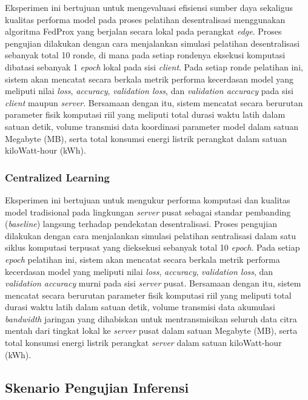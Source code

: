 Eksperimen ini bertujuan untuk mengevaluasi efisiensi sumber daya sekaligus kualitas performa model pada proses pelatihan desentralisasi menggunakan algoritma FedProx yang berjalan secara lokal pada perangkat \textit{edge}. Proses pengujian dilakukan dengan cara menjalankan simulasi pelatihan desentralisasi sebanyak total 10 ronde, di mana pada setiap rondenya eksekusi komputasi dibatasi sebanyak 1 \textit{epoch} lokal pada sisi \textit{client}. Pada setiap ronde pelatihan ini, sistem akan mencatat secara berkala metrik performa kecerdasan model yang meliputi nilai \textit{loss}, \textit{accuracy}, \textit{validation loss}, dan \textit{validation accuracy} pada sisi \textit{client} maupun \textit{server}. Bersamaan dengan itu, sistem mencatat secara berurutan parameter fisik komputasi riil yang meliputi total durasi waktu latih dalam satuan detik, volume transmisi data koordinasi parameter model dalam satuan Megabyte (MB), serta total konsumsi energi listrik perangkat dalam satuan kiloWatt-hour (kWh).

\subsubsection{Centralized Learning}

Eksperimen ini bertujuan untuk mengukur performa komputasi dan kualitas model tradisional pada lingkungan \textit{server} pusat sebagai standar pembanding (\textit{baseline}) langsung terhadap pendekatan desentralisasi. Proses pengujian dilakukan dengan cara menjalankan simulasi pelatihan sentralisasi dalam satu siklus komputasi terpusat yang dieksekusi sebanyak total 10 \textit{epoch}. Pada setiap \textit{epoch} pelatihan ini, sistem akan mencatat secara berkala metrik performa kecerdasan model yang meliputi nilai \textit{loss}, \textit{accuracy}, \textit{validation loss}, dan \textit{validation accuracy} murni pada sisi \textit{server} pusat. Bersamaan dengan itu, sistem mencatat secara berurutan parameter fisik komputasi riil yang meliputi total durasi waktu latih dalam satuan detik, volume transmisi data akumulasi \textit{bandwidth} jaringan yang dihabiskan untuk mentransmisikan seluruh data citra mentah dari tingkat lokal ke \textit{server} pusat dalam satuan Megabyte (MB), serta total konsumsi energi listrik perangkat \textit{server} dalam satuan kiloWatt-hour (kWh).

\subsection{Skenario Pengujian Inferensi}
\label{subsec:skenario-inferensi}

